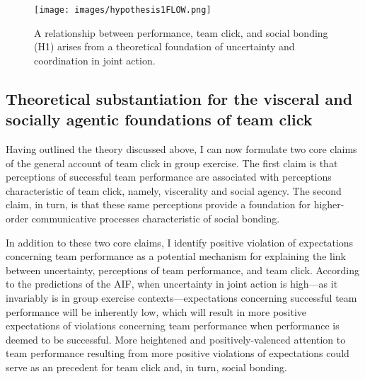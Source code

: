 \begin{CJK}{UTF8}{gbsn}
\begin{figure}[htbp]
  \texttt{[image: images/hypothesis1FLOW.png]}
  \caption{A relationship between performance, team click, and social bonding (H1) arises from a theoretical foundation of uncertainty and coordination in joint action.}
  \label{fig:hypothesis1FLOW}
\end{figure}


%






\subsection{Theoretical substantiation for the visceral and socially agentic foundations of team click \label{sect:visceralAgency}}

Having outlined the theory discussed above, I can now formulate two core claims of the general account of team click in group exercise.  The first claim is that perceptions of successful team performance are associated with perceptions characteristic of team click, namely, viscerality and social agency.  The second claim, in turn, is that these same perceptions provide a foundation for higher-order communicative processes characteristic of social bonding.

In addition to these two core claims, I identify positive violation of expectations concerning team performance as a potential mechanism for explaining the link between uncertainty, perceptions of team performance, and team click.  According to the predictions of the AIF, when uncertainty in joint action is high---as it invariably is in group exercise contexts---expectations concerning successful team performance will be inherently low, which will result in more positive expectations of violations concerning team performance when performance is deemed to be successful.  More heightened and positively-valenced attention to team performance resulting from more positive violations of expectations could serve as an precedent for team click and, in turn, social bonding.



\end{CJK}
